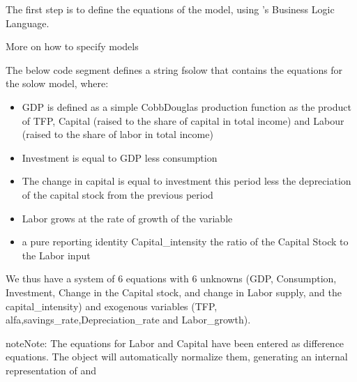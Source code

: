 \documentclass[letterpaper,10pt,english]{jupyterBook}
\begin{document}
\sphinxAtStartPar
The first step is to define the equations of the model, using ’s Business Logic Language.

\begin{sphinxShadowBox}

\sphinxAtStartPar
More on how to specify models 
\end{sphinxShadowBox}

\sphinxAtStartPar
The below code segment defines a string fsolow that contains the equations for the solow model, where:
\begin{itemize}
\item {} 
\sphinxAtStartPar
GDP is defined as a simple Cobb\sphinxhyphen{}Douglas production function as the product of TFP, Capital (raised to the share of capital in total income) and Labour (raised to the share of labor in total income)

\item {} 
\sphinxAtStartPar
Investment is equal to GDP less consumption

\item {} 
\sphinxAtStartPar
The change in capital is equal to investment this period less the depreciation of the capital stock from the previous period

\item {} 
\sphinxAtStartPar
Labor grows at the rate of growth of the variable 

\item {} 
\sphinxAtStartPar
a pure reporting identity Capital\_intensity the ratio of the Capital Stock to the Labor input

\end{itemize}

\sphinxAtStartPar
We thus have a system of 6 equations with 6 unknowns (GDP, Consumption, Investment, Change in the Capital stock, and change in Labor supply, and the capital\_intensity) and exogenous variables (TFP, alfa,savings\_rate,Depreciation\_rate and Labor\_growth).

\begin{sphinxadmonition}{note}{Note:}
\sphinxAtStartPar
The equations for Labor and Capital have been entered as difference equations. The  object will automatically normalize them, generating an internal representation of  and 
\end{sphinxadmonition}
\end{document}
